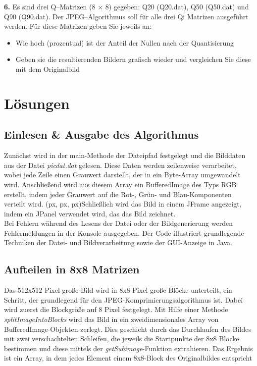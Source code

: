 \documentclass[12pt]{article}
\begin{document}
	\textbf{6.} Es sind drei Q–Matrizen (8 × 8) gegeben: Q20 (Q20.dat), Q50 (Q50.dat) und Q90 (Q90.dat). Der JPEG–Algorithmus soll für alle drei Qi Matrizen ausgeführt werden. Für diese Matrizen geben Sie jeweils an:
		\begin{itemize}
		\setlength{\itemsep}{-12pt}
		\item Wie hoch (prozentual) ist der Anteil der Nullen nach der Quantisierung\\
		\item Geben sie die resultierenden Bildern grafisch wieder und vergleichen Sie diese
		mit dem Originalbild\\
	
	\end{itemize}
	\newpage
	\section{Lösungen}
	\subsection{Einlesen \& Ausgabe des Algorithmus}
 
Zunächst wird in der main-Methode der Dateipfad festgelegt und die Bilddaten aus der Datei \textit{picdat.dat} gelesen. Diese Daten werden zeilenweise verarbeitet, wobei jede Zeile einen Grauwert darstellt, der in ein Byte-Array umgewandelt wird. Anschließend wird aus diesem Array ein BufferedImage des Typs RGB erstellt, indem jeder Grauwert auf die Rot-, Grün- und Blau-Komponenten verteilt wird. (px, px, px)Schließlich wird das Bild in einem JFrame angezeigt, indem ein JPanel verwendet wird, das das Bild zeichnet. \\

Bei Fehlern während des Lesens der Datei oder der Bildgenerierung werden Fehlermeldungen in der Konsole ausgegeben. Der Code illustriert grundlegende Techniken der Datei- und Bildverarbeitung sowie der GUI-Anzeige in Java. \\
	
	\subsection{Aufteilen in 8x8 Matrizen}
Das 512x512 Pixel große Bild wird in 8x8 Pixel große Blöcke unterteilt, ein Schritt, der grundlegend für den JPEG-Komprimierungsalgorithmus ist. Dabei wird zuerst die Blockgröße auf 8 Pixel festgelegt. Mit Hilfe einer Methode \textit{splitImageIntoBlocks} wird das Bild in ein zweidimensionales Array von BufferedImage-Objekten zerlegt. Dies geschieht durch das Durchlaufen des Bildes mit zwei verschachtelten Schleifen, die jeweils die Startpunkte der 8x8 Blöcke bestimmen und diese mittels der \textit{getSubimage}-Funktion extrahieren. Das Ergebnis ist ein Array, in dem jedes Element einem 8x8-Block des Originalbildes entspricht
\end{document}

